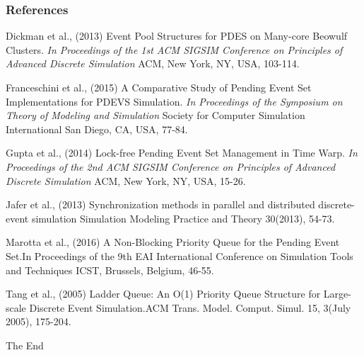 \documentclass[table]{beamer}
\begin{document}
\begin{frame}
\frametitle{References}
\footnotesize{
\begin{thebibliography}{99}\vspace*{-3.5mm}
 Dickman et al., (2013) Event Pool Structures for PDES on Many-core Beowulf Clusters. \emph{In Proceedings of the 1st ACM SIGSIM Conference on Principles of Advanced Discrete Simulation} ACM, New York, NY, USA, 103-114.

 Franceschini et al., (2015) A Comparative Study of Pending Event Set Implementations for PDEVS Simulation. \emph{In Proceedings of the Symposium on Theory of Modeling and Simulation} Society for Computer Simulation International San Diego, CA, USA, 77-84.

 Gupta et al., (2014) Lock-free Pending Event Set Management in Time Warp. \emph{In Proceedings of the 2nd ACM SIGSIM Conference on Principles of Advanced Discrete Simulation} ACM, New York, NY, USA, 15-26.

 Jafer et al., (2013) Synchronization methods in parallel and distributed discrete-event simulation{ Simulation Modeling Practice and Theory} 30(2013), 54-73.

 Marotta et al., (2016) A Non-Blocking Priority Queue for the Pending Event Set.{In Proceedings of the 9th EAI International Conference on Simulation Tools and Techniques} ICST, Brussels, Belgium, 46-55.

 Tang et al., (2005) Ladder Queue: An O(1) Priority Queue Structure for Large-scale Discrete Event Simulation.{ACM Trans. Model. Comput. Simul.} 15, 3(July 2005), 175-204.
\end{thebibliography}
}
\end{frame}


\begin{frame}
\Huge{\centerline{The End}}
\end{frame}
\end{document}
